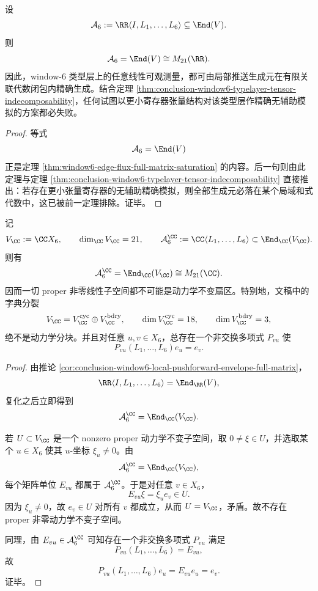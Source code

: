\begin{corollary}\label{cor:conclusion-window6-local-pushforward-envelope-full-matrix}
设
\[
\mathcal A_6:=\RR\langle I,L_1,\dots,L_6\rangle\subseteq \End(V).
\]
则
\[
\mathcal A_6=\End(V)\cong M_{21}(\RR).
\]
因此，window-\(6\) 类型层上的任意线性可观测量，都可由局部推送生成元在有限关联代数闭包内精确生成。结合定理 \ref{thm:conclusion-window6-typelayer-tensor-indecomposability}，任何试图以更小寄存器张量结构对该类型层作精确无辅助模拟的方案都必失败。
\end{corollary}
\begin{proof}
等式
\[
\mathcal A_6=\End(V)
\]
正是定理 \ref{thm:window6-edge-flux-full-matrix-saturation} 的内容。后一句则由此定理与定理 \ref{thm:conclusion-window6-typelayer-tensor-indecomposability} 直接推出：若存在更小张量寄存器的无辅助精确模拟，则全部生成元必落在某个局域和式代数中，这已被前一定理排除。证毕。
\end{proof}

\begin{theorem}\label{thm:conclusion-window6-pushforward-envelope-fullmatrix-nonblock}
记
\[
V_{\CC}:=\CC X_6,
\qquad
\dim_{\CC}V_{\CC}=21,
\qquad
\mathcal A_6^{\CC}:=\CC\langle L_1,\dots,L_6\rangle\subset \End_{\CC}(V_{\CC}).
\]
则有
\[
\mathcal A_6^{\CC}=\End_{\CC}(V_{\CC})\cong M_{21}(\CC).
\]
因而一切 proper 非零线性子空间都不可能是动力学不变扇区。特别地，文稿中的字典分裂
\[
V_{\CC}=V_{\CC}^{\mathrm{cyc}}\oplus V_{\CC}^{\mathrm{bdry}},
\qquad
\dim V_{\CC}^{\mathrm{cyc}}=18,
\qquad
\dim V_{\CC}^{\mathrm{bdry}}=3,
\]
绝不是动力学分块。并且对任意 \(u,v\in X_6\)，总存在一个非交换多项式 \(P_{vu}\) 使
\[
P_{vu}(L_1,\dots,L_6)e_u=e_v.
\]
\end{theorem}
\begin{proof}
由推论 \ref{cor:conclusion-window6-local-pushforward-envelope-full-matrix}，
\[
\RR\langle I,L_1,\dots,L_6\rangle=\End_{\RR}(V),
\]
复化之后立即得到
\[
\mathcal A_6^{\CC}=\End_{\CC}(V_{\CC}).
\]

若 \(U\subset V_{\CC}\) 是一个 nonzero proper 动力学不变子空间，取 \(0\neq \xi\in U\)，并选取某个 \(u\in X_6\) 使其 \(u\)-坐标 \(\xi_u\neq 0\)。由
\[
\mathcal A_6^{\CC}=\End_{\CC}(V_{\CC}),
\]
每个矩阵单位 \(E_{vu}\) 都属于 \(\mathcal A_6^{\CC}\)。于是对任意 \(v\in X_6\)，
\[
E_{vu}\xi=\xi_u e_v\in U.
\]
因为 \(\xi_u\neq 0\)，故 \(e_v\in U\) 对所有 \(v\) 都成立，从而 \(U=V_{\CC}\)，矛盾。故不存在 proper 非零动力学不变子空间。

同理，由 \(E_{vu}\in \mathcal A_6^{\CC}\) 可知存在一个非交换多项式 \(P_{vu}\) 满足
\[
P_{vu}(L_1,\dots,L_6)=E_{vu},
\]
故
\[
P_{vu}(L_1,\dots,L_6)e_u=E_{vu}e_u=e_v.
\]
证毕。
\end{proof}

